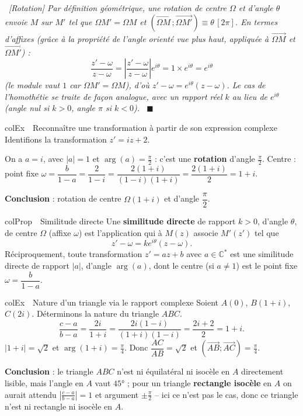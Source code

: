 \documentclass[11pt,a4paper]{article}
\newenvironment{propriete}[1][Propriété]
  {\begin{fiche}{colProp}{\ding{72}~~#1}}{\end{fiche}}
\newenvironment{exemple}[1][Exemple]
  {\begin{fiche}{colEx}{\ding{217}~~#1}}{\end{fiche}}
\newenvironment{demo}
  {\par\smallskip\noindent{\sffamily\bfseries\color{qtealdark}Démonstration.}\ \itshape}
  {\ \normalfont\hfill$\blacksquare$\par\medskip}
\begin{document}
\begin{demo}[Rotation]
Par définition géométrique, une rotation de centre $\Omega$ et d'angle $\theta$ envoie $M$ sur $M'$ tel que $\Omega M'=\Omega M$ et $(\overrightarrow{\Omega M}\,;\overrightarrow{\Omega M'})\equiv\theta\,[2\pi]$. En termes d'affixes (grâce à la propriété de l'angle orienté vue plus haut, appliquée à $\overrightarrow{\Omega M}$ et $\overrightarrow{\Omega M'}$) :
\[
  \frac{z'-\omega}{z-\omega} = \left|\frac{z'-\omega}{z-\omega}\right|e^{i\theta} = 1\times e^{i\theta} = e^{i\theta}
\]
(le module vaut $1$ car $\Omega M'=\Omega M$), d'où $z'-\omega=e^{i\theta}(z-\omega)$. Le cas de l'homothétie se traite de façon analogue, avec un rapport réel $k$ au lieu de $e^{i\theta}$ (angle nul si $k>0$, angle $\pi$ si $k<0$).
\end{demo}

\begin{exemple}[Reconnaître une transformation à partir de son expression complexe]
Identifions la transformation $z'=iz+2$.

\smallskip
On a $a=i$, avec $|a|=1$ et $\arg(a)=\frac\pi2$ : c'est une \textbf{rotation} d'angle $\frac\pi2$. Centre : point fixe $\omega=\dfrac{b}{1-a}=\dfrac{2}{1-i}=\dfrac{2(1+i)}{(1-i)(1+i)}=\dfrac{2(1+i)}{2}=1+i$.

\smallskip
\textbf{Conclusion} : rotation de centre $\Omega(1+i)$ et d'angle $\dfrac\pi2$.
\end{exemple}

\begin{propriete}[Similitude directe]
Une \textbf{similitude directe} de rapport $k>0$, d'angle $\theta$, de centre $\Omega$ (affixe $\omega$) est l'application qui à $M(z)$ associe $M'(z')$ tel que
\[
  z' - \omega = ke^{i\theta}(z-\omega).
\]
Réciproquement, toute transformation $z'=az+b$ avec $a\in\mathbb{C}^*$ est une similitude directe de rapport $|a|$, d'angle $\arg(a)$, dont le centre (si $a\ne1$) est le point fixe $\omega=\dfrac{b}{1-a}$.
\end{propriete}

\begin{exemple}[Nature d'un triangle via le rapport complexe]
Soient $A(0)$, $B(1+i)$, $C(2i)$. Déterminons la nature du triangle $ABC$.
\[
  \frac{c-a}{b-a} = \frac{2i}{1+i} = \frac{2i(1-i)}{(1+i)(1-i)} = \frac{2i+2}{2} = 1+i.
\]
$|1+i|=\sqrt2$ et $\arg(1+i)=\frac\pi4$. Donc $\dfrac{AC}{AB}=\sqrt2$ et $(\overrightarrow{AB};\overrightarrow{AC})=\frac\pi4$.

\smallskip
\textbf{Conclusion} : le triangle $ABC$ n'est ni équilatéral ni isocèle en $A$ directement lisible, mais l'angle en $A$ vaut $45°$ ; pour un triangle \textbf{rectangle isocèle} en $A$ on aurait attendu $\left|\frac{c-a}{b-a}\right|=1$ et argument $\pm\frac\pi2$ -- ici ce n'est pas le cas, donc ce triangle n'est ni rectangle ni isocèle en $A$.
\end{exemple}
\end{document}
